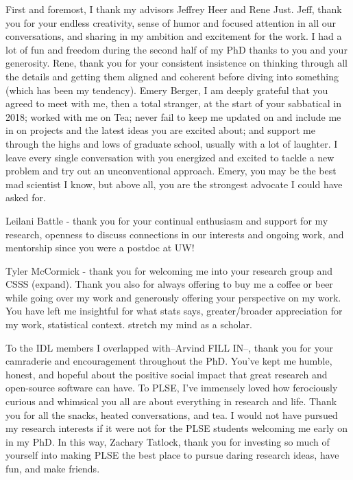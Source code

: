     First and foremost, I thank my advisors Jeffrey
    Heer and Rene Just. Jeff, thank you for your endless creativity, sense of
    humor and focused attention in all our conversations, and sharing in my
    ambition and excitement for the work. I had a lot of fun and freedom during
    the second half of my PhD thanks to you and your generosity. Rene, thank you
    for your consistent insistence on thinking through all the details and
    getting them aligned and coherent before diving into something (which has been my tendency). 
    Emery Berger, I am deeply grateful that you agreed to meet
    with me, then a total stranger, at the start of your sabbatical in 2018;
    worked with me on Tea; never fail to keep me updated on and include me in on
    projects and the latest ideas you are excited about; and support me through
    the highs and lows of graduate school, usually with a lot of laughter. I
    leave every single conversation with you energized and excited to tackle a
    new problem and try out an unconventional approach. Emery, you may be the
    best mad scientist I know, but above all, you are the strongest advocate I
    could have asked for. 
    
    Leilani Battle - thank you for your continual enthusiasm and support for my
    research, openness to discuss connections in our interests and ongoing work,
    and mentorship since you were a postdoc at UW! 
    
    Tyler McCormick - thank you for welcoming me into your research group and
    CSSS (expand). Thank you also for always offering to buy me a coffee or beer while
    going over my work and generously offering your perspective on my work. You
    have left me insightful for what stats says, greater/broader appreciation
    for my work, statistical context. stretch my mind as a scholar. 

    
    To the IDL members I overlapped with--Arvind FILL
    IN--, thank you for your camraderie and encouragement throughout the PhD.
    You've kept me humble, honest, and hopeful about the positive social impact
    that great research and open-source software can have. To PLSE, I've
    immensely loved how ferociously curious and whimsical you all are about
    everything in research and life. Thank you for all the snacks, heated
    conversations, and tea. I would not have pursued my research interests if it
    were not for the PLSE students welcoming me early on in my PhD. In this way,
    Zachary Tatlock, thank you for investing so much of yourself into making
    PLSE the best place to pursue daring research ideas, have fun, and make
    friends. 

